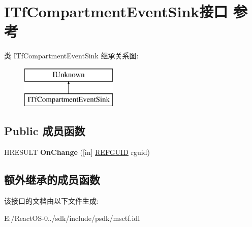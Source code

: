 \hypertarget{interface_i_tf_compartment_event_sink}{}\section{I\+Tf\+Compartment\+Event\+Sink接口 参考}
\label{interface_i_tf_compartment_event_sink}
类 I\+Tf\+Compartment\+Event\+Sink 继承关系图\+:\begin{figure}[H]
\begin{center}
\leavevmode
\includegraphics[height=2.000000cm]{interface_i_tf_compartment_event_sink}
\end{center}
\end{figure}
\subsection*{Public 成员函数}
\begin{DoxyCompactItemize}
\item 
\mbox{\label{interface_i_tf_compartment_event_sink_a136dd0eef4f66cfa505e7c265c4abe7b}} 
H\+R\+E\+S\+U\+LT {\bfseries On\+Change} (\mbox{[}in\mbox{]} \hyperlink{struct___g_u_i_d}{R\+E\+F\+G\+U\+ID} rguid)
\end{DoxyCompactItemize}
\subsection*{额外继承的成员函数}


该接口的文档由以下文件生成\+:\begin{DoxyCompactItemize}
\item 
E\+:/\+React\+O\+S-\/0../sdk/include/psdk/msctf.\+idl\end{DoxyCompactItemize}
